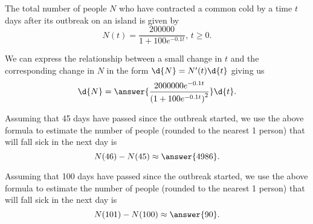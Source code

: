 \documentclass{ximera}
\author{Nela Lakos \and Kyle Parsons}
\begin{document}
\begin{exercise}

The total number of people $N$ who have contracted a common cold by a time $t$ days after its outbreak on an island is given by
\[
N(t) = \frac{200000}{1+100e^{-0.1t}},\,t\geq0.
\]

We can express the relationship between a small change in $t$ and the corresponding change in $N$ in the form $\d{N} = N'(t)\d{t}$ giving us
\[
\d{N} = \answer{\frac{2000000e^{-0.1t}}{\left(1+100e^{-0.1t}\right)^2}}\d{t}.
\]

Assuming that 45 days have passed since the outbreak started, we use the above formula to estimate the number of people (rounded to the nearest 1 person) that will fall sick in the next day is
\[
N(46) - N(45) \approx \answer{4986}.
\]

Assuming that 100 days have passed since the outbreak started, we use the above formula to estimate the number of people (rounded to the nearest 1 person) that will fall sick in the next day is
\[
N(101) - N(100) \approx \answer{90}.
\]

\end{exercise}
\end{document}
